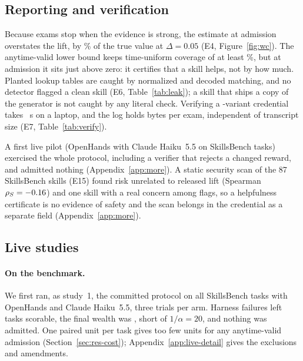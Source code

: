 \begin{table}[t]
\centering\small
\caption{Library-level control (E3), with the grid bet. Mean over 400 simulated registry histories.}
\label{tab:lib}

\end{table}

\subsection{Reporting and verification}
\label{sec:res-report}
\label{sec:res-leak}

Because exams stop when the evidence is strong, the estimate at admission overstates the lift, by \NEFourRelBiasFive\% of the true value at $\Delta=0.05$ (E4, Figure~\ref{fig:wc}). The anytime-valid lower bound keeps time-uniform coverage of at least \NEFourCoverMin\%, but at admission it sits just above zero: it certifies that a skill helps, not by how much. Planted lookup tables are caught by normalized and decoded matching, and no detector flagged a clean skill (E6, Table~\ref{tab:leak}); a skill that ships a copy of the generator is not caught by any literal check. Verifying a \NESevenN-variant credential takes \NESevenVerify{}~s on a laptop, and the log holds \NESevenLedger{} bytes per exam, independent of transcript size (E7, Table~\ref{tab:verify}).

A first live pilot (OpenHands with Claude Haiku~5.5 on \NPilotTasks{} SkillsBench tasks) exercised the whole protocol, including a verifier that rejects a changed reward, and admitted nothing (Appendix~\ref{app:more}). A static security scan of the 87 SkillsBench skills (E15) found risk unrelated to released lift (Spearman $\rho_S=-0.16$) and one skill with a real concern among \NSecFlagN{} flags, so a helpfulness certificate is no evidence of safety and the scan belongs in the credential as a separate field (Appendix~\ref{app:more}).

\subsection{Live studies}
\label{sec:res-live}
\paragraph{On the benchmark.} We first ran, as study~1, the committed protocol on all \NLoTasks{} SkillsBench tasks with OpenHands and Claude Haiku~5.5, three trials per arm. Harness failures left \NLoScored{} tasks scorable, the final wealth was \NLoWealth, short of $1/\alpha=20$, and nothing was admitted. One paired unit per task gives too few units for any anytime-valid admission (Section~\ref{sec:res-cost}); Appendix~\ref{app:live-detail} gives the exclusions and amendments.

